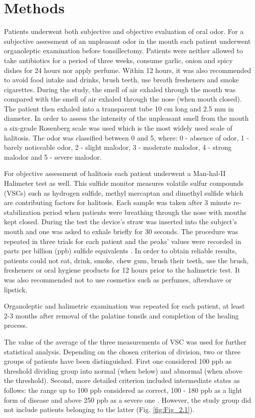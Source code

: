 \documentclass[12pt,a4paper,notitlepage]{report}
\begin{document}
\section{Methods}

Patients underwent both subjective and objective evaluation of oral odor. 
For a subjective assessment of an unpleasant odor in the mouth each patient underwent organoleptic examination before tonsillectomy. Patients were neither allowed to take antibiotics for a period of three weeks, consume garlic, onion and spicy dishes for 24 hours nor apply perfume. Within 12 hours, it was also recommended to avoid food intake and drinks, brush teeth, use breath fresheners and smoke cigarettes. During the study, the smell of air exhaled through the mouth was compared with the smell of air exhaled through the nose (when mouth closed). The patient then exhaled into a transparent tube 10 cm long and 2.5 mm in diameter. In order to assess the intensity of the unpleasant smell from the mouth a six-grade Rosenberg \cite{Rosenberg92} scale was used which is the most widely used scale of halitosis. The odor was classified between 0 and 5, where: 0 - absence of odor, 1 - barely noticeable odor, 2 - slight malodor, 3 - moderate malodor, 4 - strong malodor and 5 - severe malodor.\

For objective assessment of halitosis each patient underwent a Man-hal-II Halimeter test as well. This sulfide monitor measures volatile sulfur compounds (VSCs) such as hydrogen sulfide, methyl mercaptan and dimethyl sulfide which are contributing factors for halitosis. Each sample was taken after 3 minute re-stabilization period when patients were breathing through the nose with  mouths kept closed. During the test the device's straw was inserted into the subject’s mouth and one was asked to exhale briefly for 30 seconds. 
The procedure was repeated in three trials for each patient and the peaks' values were recorded in parts per billion (ppb) sulfide equivalents \cite{Alasqah16}.
In order to obtain reliable results, patients could not eat, drink, smoke, chew gum, brush their teeth, use the brush, fresheners or oral hygiene products for 12 hours prior to the halimetric test. It was also recommended not to use cosmetics such as perfumes, aftershave or lipstick. \

Organoleptic and halimetric examination was repeated for each patient, at least 2-3 months after removal of the palatine tonsils and completion of the healing process.

The value of the average of the three measurements of VSC was used for further statistical analysis. Depending on the chosen criterion of division, two or three groups of patients have been distinguished. First one considered 100 ppb as threshold dividing group into normal (when below) and abnormal (when above the threshold). Second, more detailed criterion included intermediate states as follows: the range up to 100 ppb considered as correct, 100 - 180 ppb as a light form of disease and above 250 ppb as a severe one \cite{Lee04}. However, the study group did not include patients belonging to the latter (Fig. \ref{fig:Fig_2.1}).  
\end{document}
